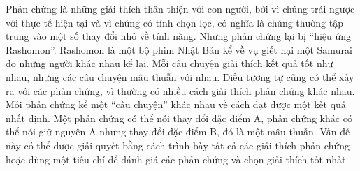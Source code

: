 Phản chứng là những giải thích thân thiện với con người, bởi vì chúng trái ngược với thực tế hiện tại và vì chúng có tính chọn lọc, có nghĩa là chúng thường tập trung vào một số thay đổi nhỏ về tính năng. Nhưng phản chứng lại bị ``hiệu ứng Rashomon''. Rashomon là một bộ phim Nhật Bản kể về vụ giết hại một Samurai do những người khác nhau kể lại. Mỗi câu chuyện giải thích kết quả tốt như nhau, nhưng các câu chuyện mâu thuẫn với nhau. Điều tương tự cũng có thể xảy ra với các phản chứng, vì thường có nhiều cách giải thích phản chứng khác nhau. Mỗi phản chứng kể một ``câu chuyện'' khác nhau về cách đạt được một kết quả nhất định. Một phản chứng có thể nói thay đổi đặc điểm A, phản chứng khác có thể nói giữ nguyên A nhưng thay đổi đặc điểm B, đó là một mâu thuẫn. Vấn đề này có thể được giải quyết bằng cách trình bày tất cả các giải thích phản chứng hoặc dùng một tiêu chí để đánh giá các phản chứng và chọn giải thích tốt nhất.

